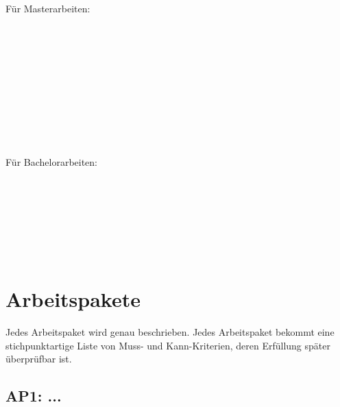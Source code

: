 \documentclass[german=true,thesistype=bachelor,proposal]{tubsthesis}
\begin{document}
\begin{thesis}
Für Masterarbeiten:\\
\begin{ganttchart}{1}{24}
 \\
 \\
 \\
 \\
 \\ %
 \\ %
 \\
 \\
 \\
\end{ganttchart}

Für Bachelorarbeiten:\\
\begin{ganttchart}{1}{12}
 \\
 \\
 \\
 \\
 \\
 \\
\end{ganttchart}

\section{Arbeitspakete} %
Jedes Arbeitspaket wird genau beschrieben.
Jedes Arbeitspaket bekommt eine stichpunktartige Liste von Muss- und Kann-Kriterien,
deren Erfüllung später überprüfbar ist.

\lipsum[4]

\subsection{AP1: ...} %
\lipsum[1]


\end{thesis}
\end{document}
